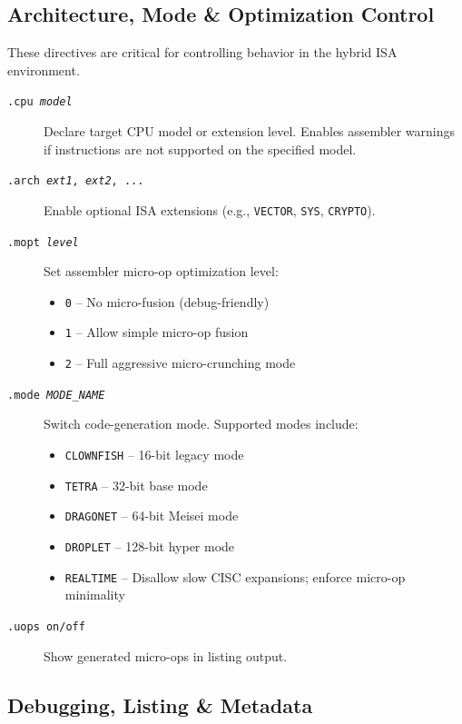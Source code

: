 \documentclass[12pt]{article}
\begin{document}
\subsection{Architecture, Mode \& Optimization Control}

These directives are critical for controlling behavior in the hybrid ISA environment.

\begin{description}
\item[\texttt{.cpu \textit{model}}] Declare target CPU model or extension level. Enables assembler warnings if instructions are not supported on the specified model.

\item[\texttt{.arch \textit{ext1}, \textit{ext2}, ...}] Enable optional ISA extensions (e.g., \texttt{VECTOR}, \texttt{SYS}, \texttt{CRYPTO}).

\item[\texttt{.mopt \textit{level}}] Set assembler micro-op optimization level:
\begin{itemize}
\item \texttt{0} -- No micro-fusion (debug-friendly)
\item \texttt{1} -- Allow simple micro-op fusion
\item \texttt{2} -- Full aggressive micro-crunching mode
\end{itemize}

\item[\texttt{.mode \textit{MODE\_NAME}}] Switch code-generation mode. Supported modes include:
\begin{itemize}
\item \texttt{CLOWNFISH} -- 16-bit legacy mode
\item \texttt{TETRA} -- 32-bit base mode
\item \texttt{DRAGONET} -- 64-bit Meisei mode
\item \texttt{DROPLET} -- 128-bit hyper mode
\item \texttt{REALTIME} -- Disallow slow CISC expansions; enforce micro-op minimality
\end{itemize}

\item[\texttt{.uops on/off}] Show generated micro-ops in listing output.
\end{description}

\subsection{Debugging, Listing \& Metadata}
\end{document}
